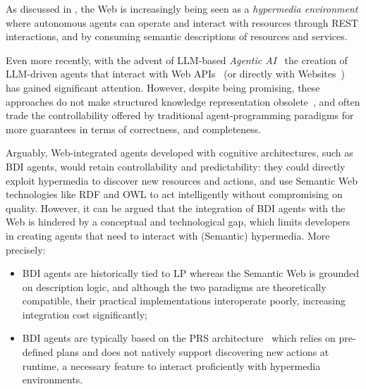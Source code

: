 As discussed in , the Web is increasingly being seen as a \emph{hypermedia environment} where autonomous agents can operate and interact with resources through \ac{REST} interactions, and by consuming semantic descriptions of resources and services.

Even more recently,
with the advent of \ac{LLM}-based \emph{Agentic AI}~\cite{Acharya_Kuppan_Divya_2025}
the creation of \ac{LLM}-driven agents that interact with Web APIs~\cite{10.5555/3692070.3692540}
(or directly with Websites~\cite{10.5555/3692070.3694608})
has gained significant attention.
%
However,
despite being promising,
these approaches
do not make structured knowledge representation obsolete~\cite{pan2024tkde},
and often trade the controllability offered by traditional agent-programming paradigms
for more guarantees in terms of correctness, and completeness.

Arguably,
Web-integrated agents developed with cognitive architectures,
such as \ac{BDI} agents,
would retain controllability and predictability:
they could directly exploit hypermedia to discover new resources and actions,
and use Semantic Web technologies like \ac{RDF} and \ac{OWL}
to act intelligently without compromising on quality.
%
However,
it can be argued that
the integration of \ac{BDI} agents with the Web
is hindered by a conceptual and technological gap,
which limits developers in creating agents that need to interact with (Semantic) hypermedia.
%
More precisely:
\begin{itemize}
  \item\label{gap:logic}
  \ac{BDI} agents are historically tied to \ac{LP}
  whereas the Semantic Web is grounded on description logic,
  and although the two paradigms are theoretically compatible,
  their practical implementations interoperate poorly,
  increasing integration cost significantly;

  \item\label{gap:open-world}
  \ac{BDI} agents are typically based on the \ac{PRS} architecture~\cite{georgeff1987reactive}
  which relies on pre-defined plans and does not natively support discovering new actions at runtime,
  a necessary feature to interact proficiently with hypermedia environments.
\end{itemize}

